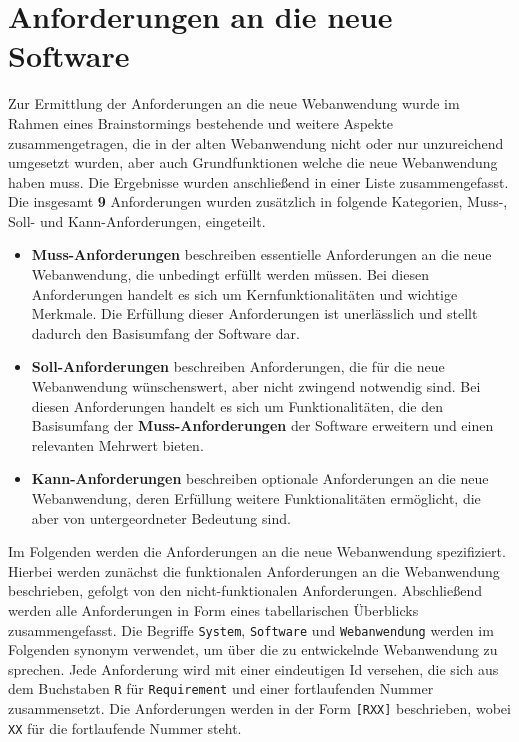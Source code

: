
\chapter{Anforderungen an die neue Software}
\label{chapter:5}

Zur Ermittlung der Anforderungen an die neue Webanwendung wurde im Rahmen eines Brainstormings bestehende und weitere Aspekte zusammengetragen, die in der alten Webanwendung nicht oder nur unzureichend umgesetzt wurden, aber auch Grundfunktionen welche die neue Webanwendung haben muss. Die Ergebnisse wurden anschließend in einer Liste zusammengefasst. Die insgesamt \textbf{9} Anforderungen wurden zusätzlich in folgende Kategorien, Muss-, Soll- und Kann-Anforderungen, eingeteilt.

\begin{itemize}
    \item \textbf{Muss-Anforderungen} beschreiben essentielle Anforderungen an die neue Webanwendung, die unbedingt erfüllt werden müssen. Bei diesen Anforderungen handelt es sich um Kernfunktionalitäten und wichtige Merkmale. Die Erfüllung dieser Anforderungen ist unerlässlich und stellt dadurch den Basisumfang der Software dar.

    \item \textbf{Soll-Anforderungen} beschreiben Anforderungen, die für die neue Webanwendung wünschenswert, aber nicht zwingend notwendig sind. Bei diesen Anforderungen handelt es sich um Funktionalitäten, die den Basisumfang der \textbf{Muss-Anforderungen} der Software erweitern und einen relevanten Mehrwert bieten.

    \item \textbf{Kann-Anforderungen} beschreiben optionale Anforderungen an die neue Webanwendung, deren Erfüllung weitere Funktionalitäten ermöglicht, die aber von untergeordneter Bedeutung sind.
\end{itemize}

Im Folgenden werden die Anforderungen an die neue Webanwendung spezifiziert. Hierbei werden zunächst die funktionalen Anforderungen an die Webanwendung beschrieben, gefolgt von den nicht-funktionalen Anforderungen. Abschließend werden alle Anforderungen in Form eines tabellarischen Überblicks zusammengefasst. Die Begriffe \texttt{System}, \texttt{Software} und \texttt{Webanwendung} werden im Folgenden synonym verwendet, um über die zu entwickelnde Webanwendung zu sprechen. Jede Anforderung wird mit einer eindeutigen Id versehen, die sich aus dem Buchstaben \texttt{R} für \texttt{Requirement} und einer fortlaufenden Nummer zusammensetzt. Die Anforderungen werden in der Form \texttt{[RXX]} beschrieben, wobei \texttt{XX} für die fortlaufende Nummer steht.

